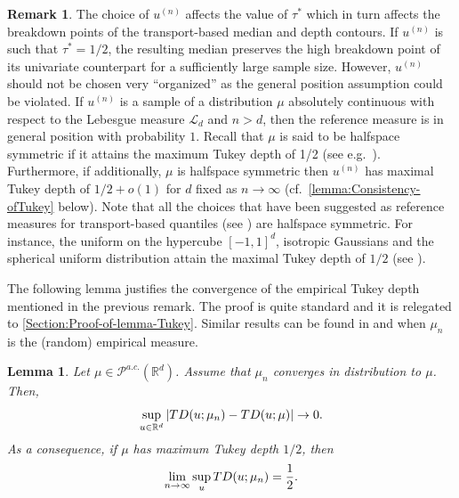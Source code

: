 \documentclass[11pt]{article}
\newcommand{\R}{\mathbb{R}}
\theoremstyle{plain}
\newtheorem{lemma}[sectioncount]{Lemma}
\theoremstyle{definition}
\newtheorem{remark}[sectioncount]{Remark}
\begin{document}
 \begin{remark}\label{rem:ref_measure}
     The choice of  $u^{(n)}$ affects the value of  $\tau^*$ which in turn affects the breakdown points of the transport-based median and depth contours. If $u^{(n)}$  is such that   $\tau^*=1/2$, the resulting median  preserves the high breakdown point of its univariate counterpart  {for a sufficiently large sample size}. However, $u^{(n)}$ should not be chosen very ``organized'' as the  general position assumption could be violated. If $u^{(n)}$  is a sample of a  distribution $\mu$ absolutely continuous  with respect to  the Lebesgue measure $\mathcal{L}_d$ and $n>d$, then the reference measure is in general position with probability $1$. Recall that $\mu$ is said to be halfspace symmetric if it attains the maximum Tukey depth of 1/2 (see e.g.~\cite{zuo:serfling2000}). Furthermore, if additionally, $\mu$ is halfspace symmetric  then $u^{(n)}$ has maximal Tukey depth of $1/2+o(1)$ for $d$ fixed as $n\to \infty$  {(cf.~\autoref{lemma:Consistency-ofTukey} below)}. %
 {     Note that  all the choices that have been suggested as reference measures for transport-based quantiles (see \cite{ChernozhukovEtAl.17.AOS,Figalli.2018,HallinDelBarrioCuestaAlbertosMatran.21,huang:sen2023,delBarrioGonzalezSanz.2024}) are halfspace symmetric.  For instance,  the uniform on the hypercube $[-1,1]^d$, isotropic Gaussians and the spherical uniform distribution   attain the maximal Tukey depth of $1/2$ (see \cite{donoho:gasko1992}).}
 \end{remark}
 {
The following lemma justifies the convergence of the empirical Tukey depth mentioned in the previous remark. The proof is quite standard and it is relegated to \autoref{Section:Proof-of-lemma-Tukey}. Similar results can be found in \cite[Eq.~(6.2)]{donoho:gasko1992} and \cite[Proposition~2.4]{masse2002} when $\mu_n$ is the (random) empirical measure. 
%
\begin{lemma}\label{lemma:Consistency-ofTukey}
     Let $\mu\in \mathcal{P}^{a.c.}(\R^d)$. Assume that $\mu_n $ converges in distribution to $\mu$. Then, 
     $$  \sup_{u\in \R^d}|{\rm TD}(u; \mu_n) - {\rm TD}(u; \mu)|\to 0.$$ As a consequence, if $\mu$ has  maximum Tukey depth $1/2$, then $$\lim_{n\to \infty}\sup_{u} {\rm TD}(u;\mu_n) = \frac{1}{2}. $$  
 \end{lemma}}
%
\end{document}

